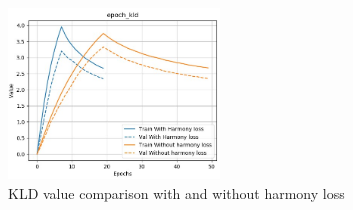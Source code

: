 \documentclass[12pt]{report}
\begin{document}
\begin{figure}[htbp]
    \centering
    \includegraphics[width=0.5\textwidth]{images/experiences/harmony-rnn/kld-comparison-harmony.jpg}
    \caption{KLD value comparison with and without harmony loss}
    \label{fig:kld-comparison-harmony}
\end{figure}
\end{document}
